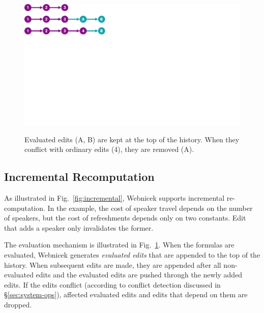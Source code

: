 \documentclass[sigconf,anonymous,screen]{acmart}
\begin{document}
\begin{figure}[t]
\centering
\vspace{-0.5em}
\begin{minipage}{0.55\columnwidth}
  ~\\[1em]
  \includegraphics[width=0.9\columnwidth,clip,trim=0cm 14cm 21cm 0cm]{fig/eval.pdf}
  \end{minipage}%
  \begin{minipage}{0.45\columnwidth}
    \caption{Evaluated edits (A, B) are kept at the top of the history. When they conflict with
    ordinary edits (4), they are removed (A).}
    \label{fig:eval}
  \end{minipage}
  \vspace{-1em}
\end{figure}


\subsection{Incremental Recomputation}
\label{sec:impl-incremental}

As illustrated in Fig.~\ref{fig:incremental}, Webnicek supports incremental re-computa\-tion.
In the example, the cost of speaker travel depends on the number of speakers, but the cost
of refreshments depends only on two constants. Edit that adds a speaker only invalidates the
former.

The evaluation mechanism is illustrated in Fig.~\ref{fig:eval}. When the formulas are evaluated,
Webnicek generates \emph{evaluated edits} that are appended to the top of the history.
When subsequent edits are made, they are appended after all non-evaluated edits and the
evaluated edits are pushed through the newly added edits. If the edits conflict (according to
conflict detection discussed in \S\ref{sec:system-ops}), affected evaluated edits and edits that
depend on them are dropped.
\end{document}
